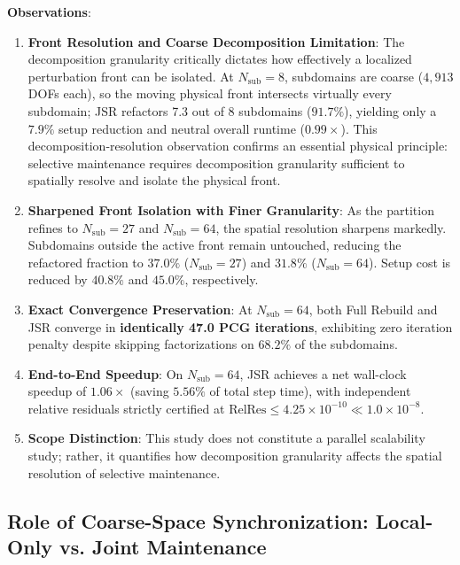\documentclass[preprint,12pt,3p]{elsarticle}
\begin{document}
\textbf{Observations}:
\begin{enumerate}
    \item \textbf{Front Resolution and Coarse Decomposition Limitation}: The decomposition granularity critically dictates how effectively a localized perturbation front can be isolated. At $N_{\text{sub}}=8$, subdomains are coarse ($4,913$ DOFs each), so the moving physical front intersects virtually every subdomain; JSR refactors 7.3 out of 8 subdomains ($91.7\%$), yielding only a $7.9\%$ setup reduction and neutral overall runtime ($0.99\times$). This decomposition-resolution observation confirms an essential physical principle: selective maintenance requires decomposition granularity sufficient to spatially resolve and isolate the physical front.
    \item \textbf{Sharpened Front Isolation with Finer Granularity}: As the partition refines to $N_{\text{sub}}=27$ and $N_{\text{sub}}=64$, the spatial resolution sharpens markedly. Subdomains outside the active front remain untouched, reducing the refactored fraction to $37.0\%$ ($N_{\text{sub}}=27$) and $31.8\%$ ($N_{\text{sub}}=64$). Setup cost is reduced by $40.8\%$ and $45.0\%$, respectively.
    \item \textbf{Exact Convergence Preservation}: At $N_{\text{sub}}=64$, both Full Rebuild and JSR converge in \textbf{identically 47.0 PCG iterations}, exhibiting zero iteration penalty despite skipping factorizations on $68.2\%$ of the subdomains.
    \item \textbf{End-to-End Speedup}: On $N_{\text{sub}}=64$, JSR achieves a net wall-clock speedup of $1.06\times$ (saving $5.56\%$ of total step time), with independent relative residuals strictly certified at $\text{RelRes} \le 4.25 \times 10^{-10} \ll 1.0 \times 10^{-8}$.
    \item \textbf{Scope Distinction}: This study does not constitute a parallel scalability study; rather, it quantifies how decomposition granularity affects the spatial resolution of selective maintenance.
\end{enumerate}

\subsection{Role of Coarse-Space Synchronization: Local-Only vs. Joint Maintenance}
\label{subsec:res_coarse_ablation}
\end{document}
